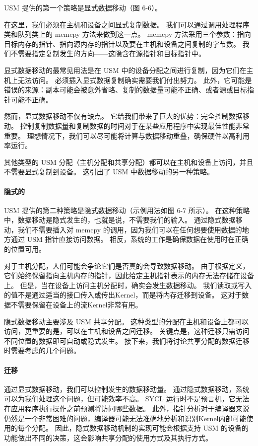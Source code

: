 USM 提供的第一个策略是显式数据移动（图 6-6）。

在这里，我们必须在主机和设备之间显式复制数据。 我们可以通过调用处理程序类和队列类上的 memcpy 方法来做到这一点。 
memcpy 方法采用三个参数：指向目标内存的指针、指向源内存的指针以及要在主机和设备之间复制的字节数。 
我们不需要指定复制发生的方向——这隐含在源指针和目标指针中。

显式数据移动的最常见用法是在 USM 中的设备分配之间进行复制，因为它们在主机上无法访问。 
必须插入显式数据复制确实需要我们付出努力。 
此外，它可能是错误的来源：副本可能会被意外省略、复制的数据量可能不正确、或者源或目标指针可能不正确。

然而，显式数据移动不仅有缺点。 它给我们带来了巨大的优势：完全控制数据移动。 
控制复制数据量和复制数据的时间对于在某些应用程序中实现最佳性能非常重要。 
理想情况下，我们可以尽可能将计算与数据移动重叠，确保硬件以高利用率运行。

其他类型的 USM 分配（主机分配和共享分配）都可以在主机和设备上访问，并且不需要显式复制到设备。 
这引出了 USM 中数据移动的另一种策略。

\paragraph{隐式的}

USM 提供的第二种策略是隐式数据移动（示例用法如图 6-7 所示）。 
在这种策略中，数据移动是隐式发生的，也就是说，不需要我们的输入。 
通过隐式数据移动，我们不需要插入对 memcpy 的调用，因为我们可以在任何想要使用数据的地方通过 USM 指针直接访问数据。 
相反，系统的工作是确保数据在使用时在正确的位置可用。

对于主机分配，人们可能会争论它们是否真的会导致数据移动。 
由于根据定义，它们始终保留指向主机内存的指针，因此给定主机指针表示的内存无法存储在设备上。 
但是，当在设备上访问主机分配时，确实会发生数据移动。 
我们读取或写入的值不是通过适当的接口传入或传出Kernel，而是将内存迁移到设备。 
这对于数据不需要保留在设备上的流Kernel非常有用。

隐式数据移动主要涉及 USM 共享分配。 这种类型的分配在主机和设备上都可以访问，更重要的是，可以在主机和设备之间迁移。 
关键点是，这种迁移只需访问不同位置的数据即可自动或隐式发生。 
接下来，我们将讨论共享分配的数据迁移时需要考虑的几个问题。

\paragraph{迁移}

通过显式数据移动，我们可以控制发生的数据移动量。 通过隐式数据移动，系统可以为我们处理这个问题，但可能效率不高。 
SYCL 运行时不是预言机，它无法在应用程序执行操作之前预测将访问哪些数据。 
此外，指针分析对于编译器来说仍然是一个非常困难的问题，编译器可能无法准确地分析和识别Kernel内部可能使用的每个分配。 
因此，隐式数据移动机制的实现可能会根据支持 USM 的设备的功能做出不同的决策，这会影响共享分配的使用方式及其执行方式。

